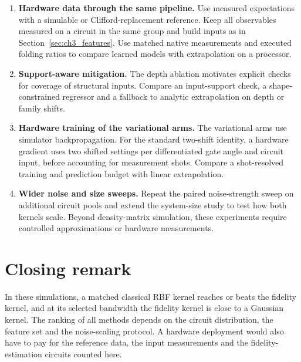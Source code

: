 \documentclass[Thesis.tex]{subfiles}
\begin{document}
\begin{enumerate}
    \item \textbf{Hardware data through the same pipeline.} Use measured
    expectations with a simulable or Clifford-replacement reference. Keep
    all observables measured on a circuit in the same group and build inputs
    as in Section~\ref{sec:ch3_features}. Use matched native measurements
    and executed folding ratios to compare learned models with extrapolation
    on a processor.

    \item \textbf{Support-aware mitigation.} The depth ablation motivates
    explicit checks for coverage of structural inputs. Compare an input-support
    check, a shape-constrained regressor and a fallback to analytic extrapolation
    on depth or family shifts.

    \item \textbf{Hardware training of the variational arms.} The variational
    arms use simulator backpropagation. For the standard two-shift identity, a
    hardware gradient uses two shifted settings per differentiated gate angle
    and circuit input, before accounting for measurement shots. Compare a
    shot-resolved training and prediction budget with linear extrapolation.

    \item \textbf{Wider noise and size sweeps.} Repeat the paired noise-strength
    sweep on additional circuit pools and extend the system-size study to
    test how both kernels scale. Beyond density-matrix simulation, these
    experiments require controlled approximations or hardware measurements.

\end{enumerate}

\section{Closing remark}

In these simulations, a matched classical RBF kernel reaches or beats the fidelity
kernel, and at its selected bandwidth the fidelity kernel is close to a Gaussian kernel.
The ranking of all methods depends on the circuit distribution, the feature set and the
noise-scaling protocol. A hardware deployment would also have to pay for the reference
data, the input measurements and the fidelity-estimation circuits counted here.
\end{document}
